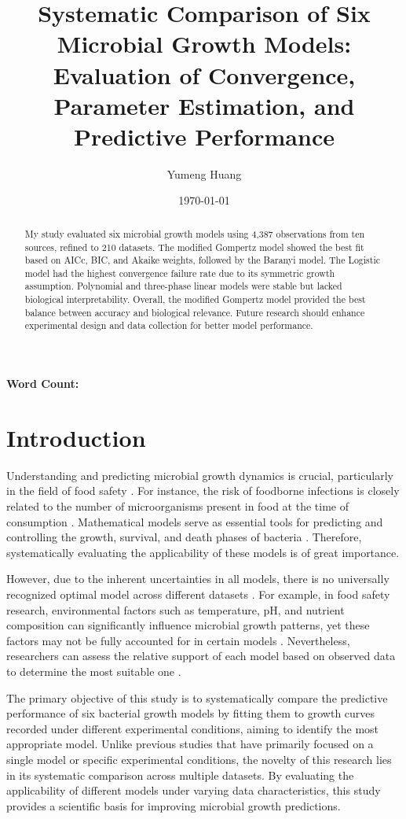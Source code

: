\documentclass[12pt]{article}
\title{Systematic Comparison of Six Microbial Growth Models: Evaluation of Convergence, Parameter Estimation, and Predictive Performance}
\author{Yumeng Huang}
\date{\today}
\newcommand\wordcount{%
  \immediate\write18{texcount -sum -inc -0 main.tex > wordcount.txt} %
}
\begin{document}
\maketitle

% 
\noindent \textbf{Word Count:} \wordcount

\begin{abstract}
My study evaluated six microbial growth models using 4,387 observations from ten sources, refined to 210 datasets. The modified Gompertz model showed the best fit based on AICc, BIC, and Akaike weights, followed by the Baranyi model. The Logistic model had the highest convergence failure rate due to its symmetric growth assumption. Polynomial and three-phase linear models were stable but lacked biological interpretability. Overall, the modified Gompertz model provided the best balance between accuracy and biological relevance. Future research should enhance experimental design and data collection for better model performance.
\end{abstract}


\section{Introduction}

Understanding and predicting microbial growth dynamics is crucial, particularly in the field of food safety \citep{BaranyiRoberts1994}. For instance, the risk of foodborne infections is closely related to the number of microorganisms present in food at the time of consumption \citep{RossMcMeekin2003}. Mathematical models serve as essential tools for predicting and controlling the growth, survival, and death phases of bacteria \citep{LoGrasso2023}. Therefore, systematically evaluating the applicability of these models is of great importance.

However, due to the inherent uncertainties in all models, there is no universally recognized optimal model across different datasets \citep{Marks2008}. For example, in food safety research, environmental factors such as temperature, pH, and nutrient composition can significantly influence microbial growth patterns, yet these factors may not be fully accounted for in certain models \citep{RossMcMeekin2003}. Nevertheless, researchers can assess the relative support of each model based on observed data to determine the most suitable one \citep{JohnsonOmland2004}.

The primary objective of this study is to systematically compare the predictive performance of six bacterial growth models by fitting them to growth curves recorded under different experimental conditions, aiming to identify the most appropriate model. Unlike previous studies that have primarily focused on a single model or specific experimental conditions, the novelty of this research lies in its systematic comparison across multiple datasets. By evaluating the applicability of different models under varying data characteristics, this study provides a scientific basis for improving microbial growth predictions.
\end{document}
